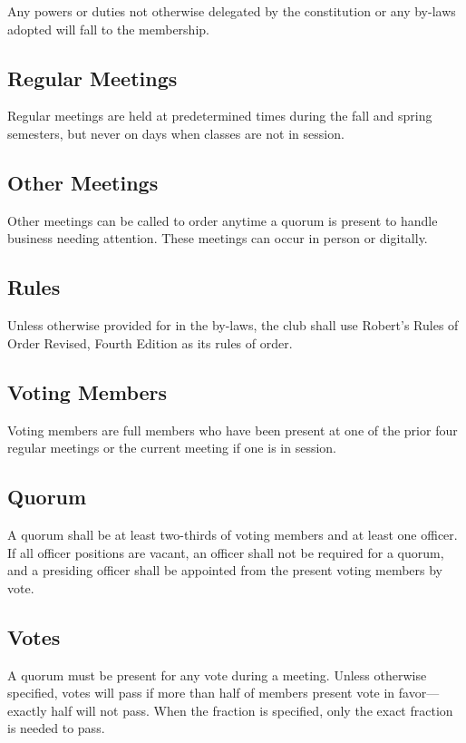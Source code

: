 \documentclass{article}
\begin{document}
Any powers or duties not otherwise delegated by the constitution or any by-laws
adopted will fall to the membership.

\subsection{Regular Meetings}

Regular meetings are held at predetermined times during the fall and spring
semesters, but never on days when classes are not in session.

\subsection{Other Meetings}

Other meetings can be called to order anytime a quorum is present to handle
business needing attention. These meetings can occur in person or digitally.

\subsection{Rules}

Unless otherwise provided for in the by-laws, the club shall use Robert's Rules
of Order Revised, Fourth Edition as its rules of order.

\subsection{Voting Members}

Voting members are full members who have been present at one of the prior four
regular meetings or the current meeting if one is in session.

\subsection{Quorum}

A quorum shall be at least two-thirds of voting members and at least one
officer. If all officer positions are vacant, an officer shall not be required
for a quorum, and a presiding officer shall be appointed from the present voting
members by vote.

\subsection{Votes}

A quorum must be present for any vote during a meeting. Unless otherwise
specified, votes will pass if more than half of members present vote in
favor---exactly half will not pass. When the fraction is specified, only the
exact fraction is needed to pass.
\end{document}
